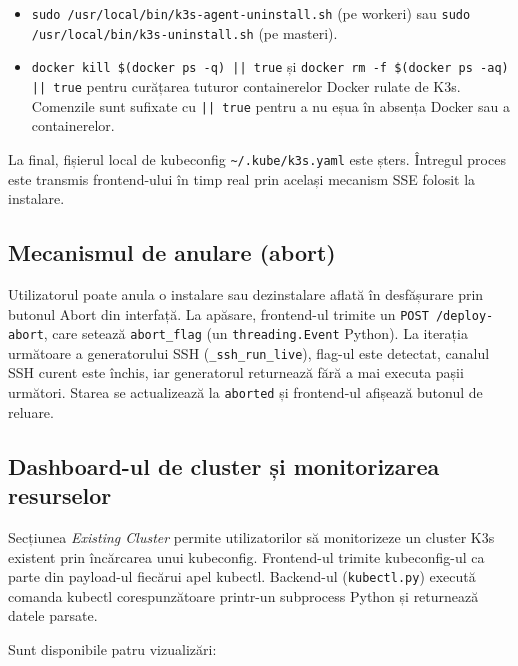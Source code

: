 \documentclass[12pt,a4paper]{report}
\begin{document}
\begin{itemize}
  \item \texttt{sudo /usr/local/bin/k3s-agent-uninstall.sh} (pe workeri) sau \texttt{sudo /usr/local/bin/k3s-uninstall.sh} (pe masteri).
  \item \texttt{docker kill \$(docker ps -q) || true} și \texttt{docker rm -f \$(docker ps -aq) || true} pentru curățarea tuturor containerelor Docker rulate de K3s. Comenzile sunt sufixate cu \texttt{|| true} pentru a nu eșua în absența Docker sau a containerelor.
\end{itemize}

La final, fișierul local de kubeconfig \texttt{\textasciitilde/.kube/k3s.yaml} este șters. Întregul proces este transmis frontend-ului în timp real prin același mecanism SSE folosit la instalare.

\subsection{Mecanismul de anulare (abort)}

Utilizatorul poate anula o instalare sau dezinstalare aflată în desfășurare prin butonul Abort din interfață. La apăsare, frontend-ul trimite un \texttt{POST /deploy-abort}, care setează \texttt{abort\_flag} (un \texttt{threading.Event} Python). La iterația următoare a generatorului SSH (\texttt{\_ssh\_run\_live}), flag-ul este detectat, canalul SSH curent este închis, iar generatorul returnează fără a mai executa pașii următori. Starea se actualizează la \texttt{aborted} și frontend-ul afișează butonul de reluare.

\subsection{Dashboard-ul de cluster și monitorizarea resurselor}

Secțiunea \textit{Existing Cluster} permite utilizatorilor să monitorizeze un cluster K3s existent prin încărcarea unui kubeconfig. Frontend-ul trimite kubeconfig-ul ca parte din payload-ul fiecărui apel kubectl. Backend-ul (\texttt{kubectl.py}) execută comanda kubectl corespunzătoare printr-un subprocess Python și returnează datele parsate.

Sunt disponibile patru vizualizări:
\end{document}
